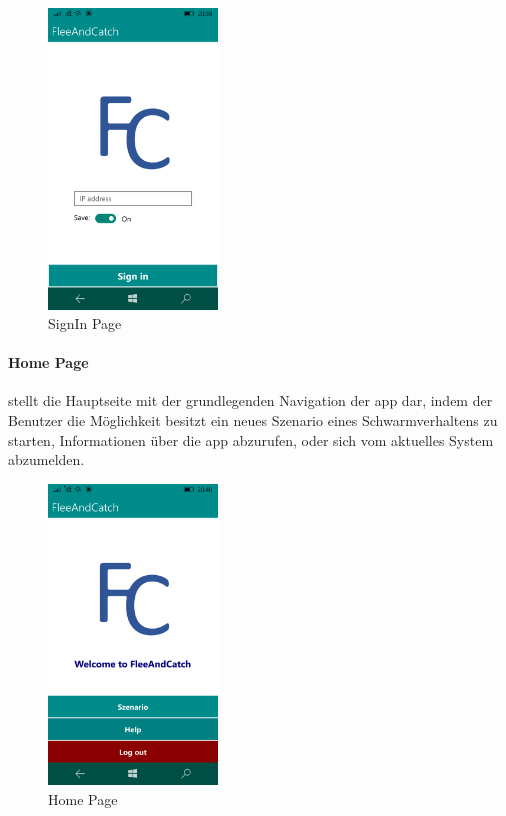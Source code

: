 \begin{figure}[h]
	\begin{center}
		\includegraphics[width=0.4\textwidth]{images/implementation/signin.png}
	\end{center}	
	\caption{SignIn Page}
	\label{fig:signin}
\end{figure}

\paragraph{Home Page} stellt die Hauptseite mit der grundlegenden Navigation der \gls{app} dar, indem der Benutzer die Möglichkeit besitzt ein neues Szenario eines Schwarmverhaltens zu starten, Informationen über die \gls{app} abzurufen, oder sich vom aktuelles System abzumelden.

\begin{figure}[h]
	\begin{center}
		\includegraphics[width=0.4\textwidth]{images/implementation/home.png}
	\end{center}	
	\caption{Home Page}
	\label{fig:home}
\end{figure}

